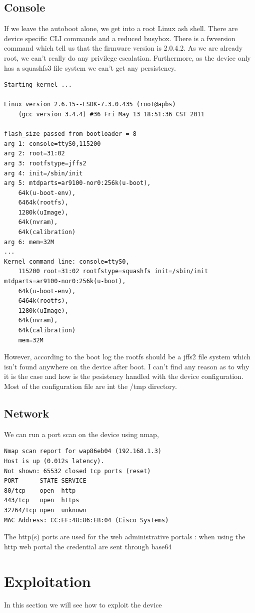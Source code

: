 \documentclass{article}
\begin{document}
\subsection{Console}
If we leave the autoboot alone, we get into a root Linux ash shell. There are device specific CLI commands and a reduced busybox. There is a fwversion command which tell us that the firmware version is 2.0.4.2. As we are already root, we can't really do any privilege escalation. Furthermore, as the device only has a squashfs3 file system we can't get any persistency.

\begin{verbatim}
Starting kernel ...

Linux version 2.6.15--LSDK-7.3.0.435 (root@apbs) 
	(gcc version 3.4.4) #36 Fri May 13 18:51:36 CST 2011

flash_size passed from bootloader = 8
arg 1: console=ttyS0,115200
arg 2: root=31:02
arg 3: rootfstype=jffs2
arg 4: init=/sbin/init
arg 5: mtdparts=ar9100-nor0:256k(u-boot),
	64k(u-boot-env),
	6464k(rootfs),
	1280k(uImage),
	64k(nvram),
	64k(calibration)
arg 6: mem=32M
...
Kernel command line: console=ttyS0,
	115200 root=31:02 rootfstype=squashfs init=/sbin/init mtdparts=ar9100-nor0:256k(u-boot),
	64k(u-boot-env),
	6464k(rootfs),
	1280k(uImage),
	64k(nvram),
	64k(calibration) 
	mem=32M 
\end{verbatim}
However, according to the boot log the rootfs should be a jffs2 file system which isn't found anywhere on the device after boot. I can't find any reason as to why it is the case and how is the pesistency handled with the device configuration. Most of the configuration file are int the /tmp directory.
\\
\subsection{Network}
We can run a port scan on the device using nmap, 
\begin{verbatim}
Nmap scan report for wap86eb04 (192.168.1.3)  
Host is up (0.012s latency).  
Not shown: 65532 closed tcp ports (reset)  
PORT      STATE SERVICE  
80/tcp    open  http  
443/tcp   open  https  
32764/tcp open  unknown  
MAC Address: CC:EF:48:86:EB:04 (Cisco Systems)
\end{verbatim}
The http(s) ports are used for the web administrative portals : when using the http web portal the credential are sent through base64 
\section{Exploitation}
In this section we will see how to exploit the device
\end{document}
